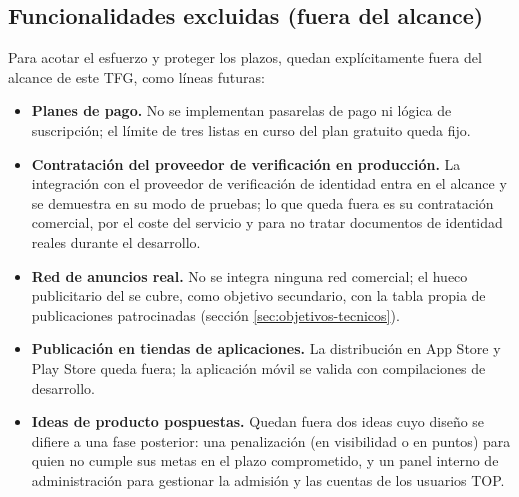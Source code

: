 \subsection{Funcionalidades excluidas (fuera del alcance)}
\label{sec:alcance-fuera}

Para acotar el esfuerzo y proteger los plazos, quedan explícitamente fuera del alcance de este \ac{TFG}, como líneas futuras:

\begin{itemize}
  \item \textbf{Planes de pago.}
        No se implementan pasarelas de pago ni lógica de suscripción; el límite de tres listas en curso del plan gratuito queda fijo.
  \item \textbf{Contratación del proveedor de verificación en producción.}
        La integración con el proveedor de verificación de identidad entra en el alcance y se demuestra en su modo de pruebas; lo que queda fuera es su contratación comercial, por el coste del servicio y para no tratar documentos de identidad reales durante el desarrollo.
  \item \textbf{Red de anuncios real.}
        No se integra ninguna red comercial; el hueco publicitario del  se cubre, como objetivo secundario, con la tabla propia de publicaciones patrocinadas (sección \ref{sec:objetivos-tecnicos}).
  \item \textbf{Publicación en tiendas de aplicaciones.}
        La distribución en App Store y Play Store queda fuera; la aplicación móvil se valida con compilaciones de desarrollo.
  \item \textbf{Ideas de producto pospuestas.}
        Quedan fuera dos ideas cuyo diseño se difiere a una fase posterior: una penalización (en visibilidad o en puntos) para quien no cumple sus metas en el plazo comprometido, y un panel interno de administración para gestionar la admisión y las cuentas de los usuarios TOP.
\end{itemize}

